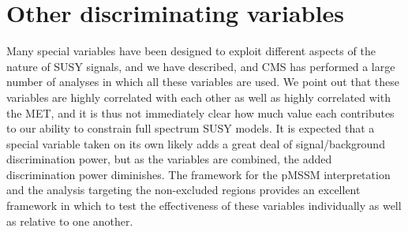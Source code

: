 \chapter{Other discriminating variables}
\label{app:discriminators}
Many special variables have been designed to exploit different aspects of the nature of SUSY signals, and we have described, and CMS has performed  a large number of analyses in which all these variables are used. We point out that these variables are highly correlated with each other as well as highly correlated with the MET, and it is thus not immediately clear how much value each contributes to our ability to constrain full spectrum SUSY models. It is expected that a special variable taken on its own likely adds a great deal of signal/background discrimination power, but as the variables are combined, the added discrimination power diminishes. The framework for the pMSSM interpretation and the analysis targeting the non-excluded regions provides an excellent framework in which to test the effectiveness of these variables individually as well as relative to one another. 
